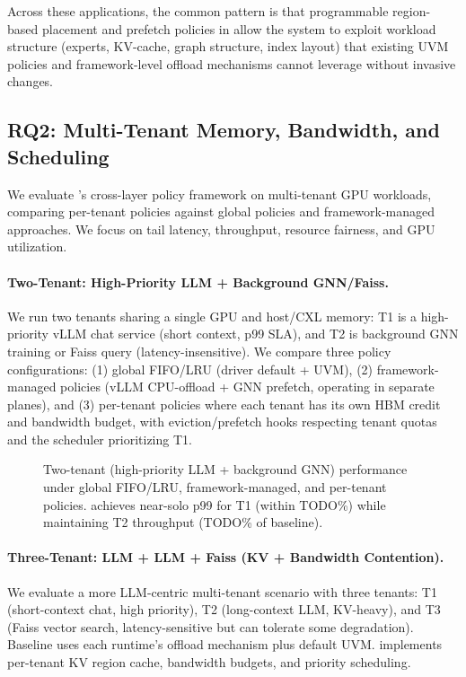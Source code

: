Across these applications, the common pattern is that programmable region-based
placement and prefetch policies in \sys allow the system to exploit workload
structure (experts, KV-cache, graph structure, index layout) that existing UVM
policies and framework-level offload mechanisms cannot leverage without invasive
changes.

\subsection{RQ2: Multi-Tenant Memory, Bandwidth, and Scheduling}

We evaluate \sys's cross-layer policy framework on multi-tenant GPU workloads, comparing per-tenant policies against global policies and framework-managed approaches. We focus on tail latency, throughput, resource fairness, and GPU utilization.

\paragraph{Two-Tenant: High-Priority LLM + Background GNN/Faiss.}
We run two tenants sharing a single GPU and host/CXL memory: T1 is a high-priority vLLM chat service (short context, p99 SLA), and T2 is background GNN training or Faiss query (latency-insensitive). We compare three policy configurations: (1) global FIFO/LRU (driver default + UVM), (2) framework-managed policies (vLLM CPU-offload + GNN prefetch, operating in separate planes), and (3) \sys per-tenant policies where each tenant has its own HBM credit and bandwidth budget, with eviction/prefetch hooks respecting tenant quotas and the scheduler prioritizing T1.

\begin{figure}
\centering
{}
\caption{Two-tenant (high-priority LLM + background GNN) performance under global FIFO/LRU, framework-managed, and \sys per-tenant policies. \sys achieves near-solo p99 for T1 (within TODO\%) while maintaining T2 throughput (TODO\% of baseline).}
\label{fig:two-tenant}
\end{figure}

\paragraph{Three-Tenant: LLM + LLM + Faiss (KV + Bandwidth Contention).}
We evaluate a more LLM-centric multi-tenant scenario with three tenants: T1 (short-context chat, high priority), T2 (long-context LLM, KV-heavy), and T3 (Faiss vector search, latency-sensitive but can tolerate some degradation). Baseline uses each runtime's offload mechanism plus default UVM. \sys implements per-tenant KV region cache, bandwidth budgets, and priority scheduling.

